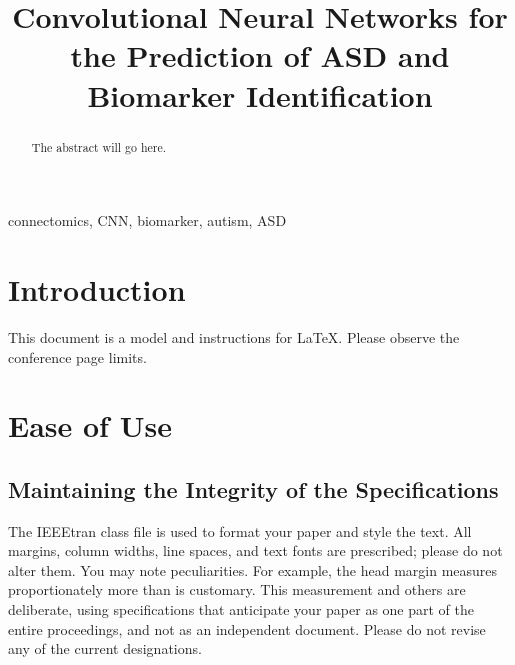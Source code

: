 \documentclass[conference]{IEEEtran}
\begin{document}
\title{Convolutional Neural Networks for the Prediction of ASD and 
       Biomarker Identification}

\author{
}

\maketitle

\begin{abstract}
    The abstract will go here.
\end{abstract}

\begin{IEEEkeywords}
    connectomics, CNN, biomarker, autism, ASD
\end{IEEEkeywords}


\section{Introduction}
This document is a model and instructions for \LaTeX.
Please observe the conference page limits. 


\section{Ease of Use}

\subsection{Maintaining the Integrity of the Specifications}

The IEEEtran class file is used to format your paper and style the text. All margins, 
column widths, line spaces, and text fonts are prescribed; please do not 
alter them. You may note peculiarities. For example, the head margin
measures proportionately more than is customary. This measurement 
and others are deliberate, using specifications that anticipate your paper 
as one part of the entire proceedings, and not as an independent document. 
Please do not revise any of the current designations.
\end{document}
